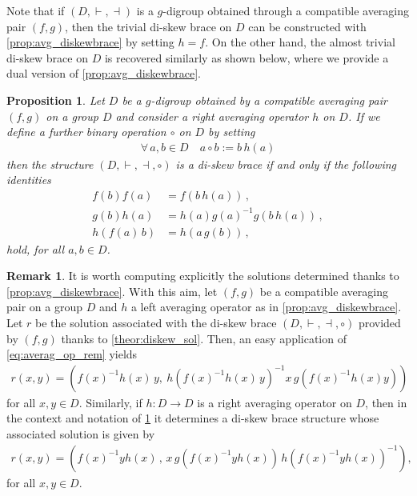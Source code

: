 \documentclass[preprint,1p]{elsarticle}
\numberwithin{equation}{section}
\newtheorem{prop}[theor]{Proposition}
\theoremstyle{definition}               %
\newtheorem{rem}[theor]{Remark}
\newcommand{\vd}{\vdash}
\newcommand{\dv}{\dashv}
\begin{document}
\smallskip

Note that if $(D,\vd,\dv)$ is a $g$-digroup obtained through a compatible averaging pair $(f,g)$, then the trivial di-skew brace on $D$ can be constructed with \cref{prop:avg_diskewbrace} by setting $h = f$.
On the other hand, the almost trivial di-skew brace on $D$ is recovered similarly as shown below, where we provide a dual version of \cref{prop:avg_diskewbrace}.

\begin{prop}\label{prop:avg_diskewbrace2}
    Let $D$ be a $g$-digroup obtained by a compatible averaging pair $(f,g)$ on a group $D$ and consider a right averaging operator $h$ on $D$. If we define a further binary operation $\circ$ on $D$ by setting
    \begin{align*}
        \forall\, a,b\in D \quad
        a \circ b := b\,h(a)
    \end{align*}
    then the structure $(D,\vd,\dv,\circ)$ is a di-skew brace if and only if the following identities
    \begin{align}
        f(b)f(a) &= f(b\,h(a))\,,\label{avg_diskew1-2}\tag{AD1$'$}\\
        g(b)h(a) &= h(a)g(a)^{-1}g(b\,h(a))\,,\label{avg_diskew2-2}\tag{AD2$'$}\\
        h(f(a)\,b) &= h(a\,g(b))\,,\label{avg_diskew3-2}\tag{AD3$'$}
    \end{align}
    hold, for all $a,b \in D$.
\end{prop}

\smallskip 

\begin{rem}\label{rem:avg_diskew_sol}
    It is worth computing explicitly the solutions determined thanks to \cref{prop:avg_diskewbrace}.
    With this aim, let $(f,g)$ be a compatible averaging pair on a group $D$ and $h$ a left averaging operator as in \cref{prop:avg_diskewbrace}.
    Let $r$ be the solution associated with the di-skew brace $(D,\vd,\dv,\circ)$ provided by $(f,g)$ thanks to \cref{theor:diskew_sol}.
    Then, an easy application of \eqref{eq:averag_op_rem} yields
    \begin{align*}
        r(x,y) =
        \left(f(x)^{-1} h(x)\, y, \ 
        h(f(x)^{-1}h(x)\,y)^{-1} x\, g(f(x)^{-1}h(x)y)
        \right)
    \end{align*}
    for all $x,y \in D$. 
    Similarly, if $h:D \to D$ is a right averaging operator on $D$, then in the context and notation of \cref{prop:avg_diskewbrace2} it determines a di-skew brace structure whose associated solution is given by
    \begin{align*}
        r(x,y) =
        \left(f(x)^{-1}yh(x) \,,\,
        x\,g(f(x)^{-1}yh(x))\, h(f(x)^{-1}yh(x))^{-1}
        \right),
    \end{align*}
    for all $x,y \in D$.
\end{rem}
\end{document}
